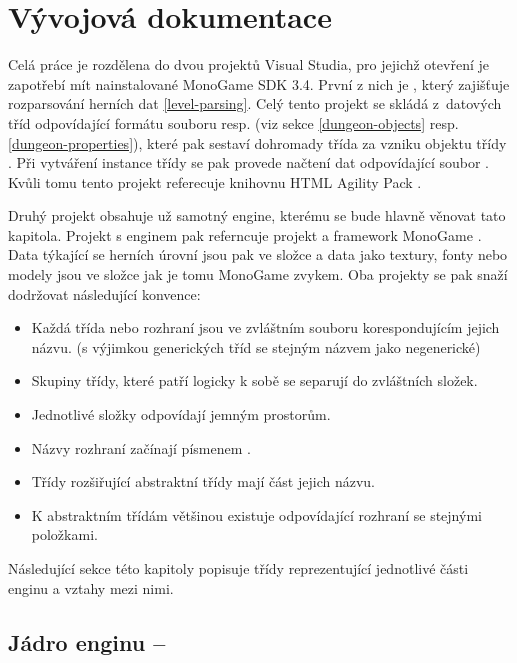 \chapter{Vývojová dokumentace}
Celá práce je rozdělena do dvou projektů Visual Studia, pro jejichž otevření je zapotřebí mít nainstalované MonoGame SDK 3.4.
První z nich je , 
který zajišťuje rozparsování herních dat \vref{level-parsing}. Celý tento projekt se skládá z~datových 
tříd odpovídající formátu souboru  resp.  (viz sekce \ref{dungeon-objects} resp. \ref{dungeon-properties}),
které pak sestaví dohromady třída  za vzniku objektu třídy .
Při vytváření instance třídy  se pak provede načtení dat odpovídající soubor .
Kvůli tomu tento projekt referecuje knihovnu HTML Agility Pack \cite{HtmlAgilityPack}.

Druhý projekt  obsahuje už samotný engine, kterému se bude hlavně věnovat tato kapitola.
Projekt s enginem pak referncuje projekt  a framework MonoGame \cite{MonoGame}.
Data týkající se herních úrovní jsou pak ve složce  a data jako textury, fonty nebo modely jsou ve složce
 jak je tomu MonoGame zvykem.  
Oba projekty se pak snaží dodržovat následující konvence:

\begin{itemize}
\item Každá třída nebo rozhraní jsou ve zvláštním souboru korespondujícím jejich názvu. (s výjimkou generických tříd se stejným názvem jako negenerické)
\item Skupiny třídy, které patří logicky k sobě se separují do zvláštních složek.
\item Jednotlivé složky odpovídají jemným prostorům.
\item Názvy rozhraní začínají písmenem .
\item Třídy rozšiřující abstraktní třídy mají část jejich názvu.
\item K abstraktním třídám většinou existuje odpovídající rozhraní se stejnými položkami.
\end{itemize}

Následující sekce této kapitoly popisuje třídy reprezentující jednotlivé části enginu a vztahy mezi nimi.

\section{Jádro enginu -- }\label{engine-core-section}

